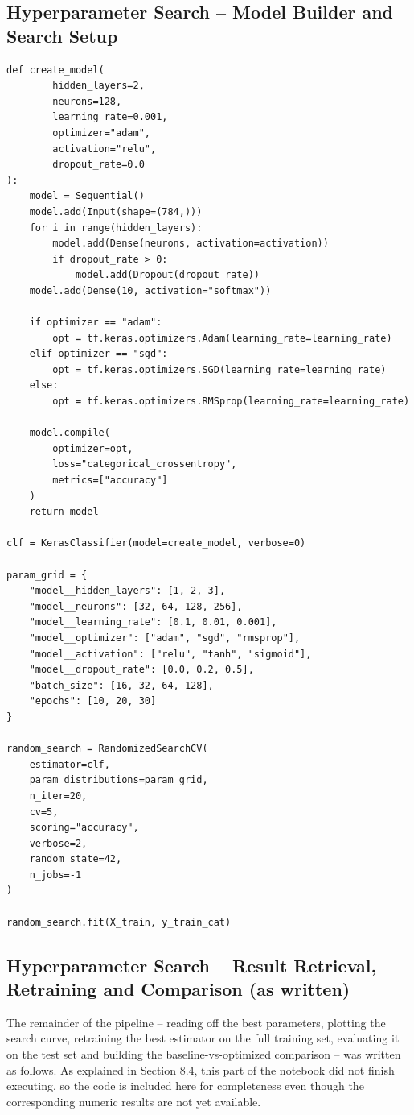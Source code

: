 \documentclass[11pt]{article}
\begin{document}
\subsection{Hyperparameter Search -- Model Builder and Search Setup}
\begin{lstlisting}
def create_model(
        hidden_layers=2,
        neurons=128,
        learning_rate=0.001,
        optimizer="adam",
        activation="relu",
        dropout_rate=0.0
):
    model = Sequential()
    model.add(Input(shape=(784,)))
    for i in range(hidden_layers):
        model.add(Dense(neurons, activation=activation))
        if dropout_rate > 0:
            model.add(Dropout(dropout_rate))
    model.add(Dense(10, activation="softmax"))

    if optimizer == "adam":
        opt = tf.keras.optimizers.Adam(learning_rate=learning_rate)
    elif optimizer == "sgd":
        opt = tf.keras.optimizers.SGD(learning_rate=learning_rate)
    else:
        opt = tf.keras.optimizers.RMSprop(learning_rate=learning_rate)

    model.compile(
        optimizer=opt,
        loss="categorical_crossentropy",
        metrics=["accuracy"]
    )
    return model

clf = KerasClassifier(model=create_model, verbose=0)

param_grid = {
    "model__hidden_layers": [1, 2, 3],
    "model__neurons": [32, 64, 128, 256],
    "model__learning_rate": [0.1, 0.01, 0.001],
    "model__optimizer": ["adam", "sgd", "rmsprop"],
    "model__activation": ["relu", "tanh", "sigmoid"],
    "model__dropout_rate": [0.0, 0.2, 0.5],
    "batch_size": [16, 32, 64, 128],
    "epochs": [10, 20, 30]
}

random_search = RandomizedSearchCV(
    estimator=clf,
    param_distributions=param_grid,
    n_iter=20,
    cv=5,
    scoring="accuracy",
    verbose=2,
    random_state=42,
    n_jobs=-1
)

random_search.fit(X_train, y_train_cat)
\end{lstlisting}

\subsection{Hyperparameter Search -- Result Retrieval, Retraining and Comparison (as written)}
The remainder of the pipeline -- reading off the best parameters, plotting the search curve, retraining the best estimator on the full training set, evaluating it on the test set and building the baseline-vs-optimized comparison -- was written as follows. As explained in Section 8.4, this part of the notebook did not finish executing, so the code is included here for completeness even though the corresponding numeric results are not yet available.
\end{document}
